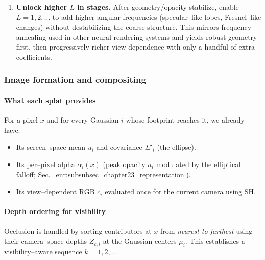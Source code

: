 \begin{enrichment}
\begin{enrichment}
\begin{enrichment}
\begin{enumerate}
            \item \textbf{Unlock higher $L$ in stages.} After geometry/opacity stabilize, enable $L{=}1,2,\ldots$ to add higher angular frequencies (specular–like lobes, Fresnel–like changes) without destabilizing the coarse structure. This mirrors frequency annealing used in other neural rendering systems and yields robust geometry first, then progressively richer view dependence with only a handful of extra coefficients.
        \end{enumerate}
        
        \subsubsection{Image formation and compositing}\label{enr:subsubsec_chapter23_image_formation}
        
        \paragraph{What each splat provides}
        For a pixel $x$ and for every Gaussian $i$ whose footprint reaches it, we already have:
        \begin{itemize}
            \item Its screen–space mean $u_i$ and covariance $\Sigma'_i$ (the ellipse).
            \item Its per–pixel alpha $\alpha_i(x)$ (peak opacity $a_i$ modulated by the elliptical falloff; Sec.~\ref{enr:subsubsec_chapter23_representation}).
            \item Its view–dependent RGB $c_i$ evaluated once for the current camera using SH.
        \end{itemize}
        
        \newpage
        
        \paragraph{Depth ordering for visibility}
        Occlusion is handled by sorting contributors at $x$ from \emph{nearest to farthest} using their camera–space depths $Z_{c,i}$ at the Gaussian centers $\mu_i$. This establishes a visibility–aware sequence $k=1,2,\dots$.
        

\end{enrichment}
\end{enrichment}
\end{enrichment}
